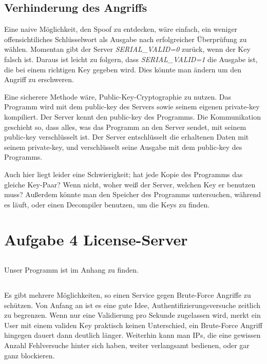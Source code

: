 \documentclass[10pt,a4paper]{article}
\begin{document}
\subsection{Verhinderung des Angriffs}
Eine naive Möglichkeit, den Spoof zu entdecken, wäre einfach, ein weniger offensichtiliches
Schlüsselwort als Ausgabe nach erfolgreicher Überprüfung zu wählen. Momentan gibt
der Server \textit{SERIAL\_VALID=0} zurück, wenn der Key falsch ist.
Daraus ist leicht zu folgern, dass \textit{SERIAL\_VALID=1} die Ausgabe ist, die
bei einem richtigen Key gegeben wird. Dies könnte man ändern um den Angriff
zu erschweren.

Eine sicherere Methode wäre, Public-Key-Cryptographie zu nutzen. Das Programm wird
mit dem public-key des Servers sowie seinem eigenen private-key kompiliert.
Der Server kennt den public-key des Programms. Die Kommunikation geschieht so,
dass alles, was das Programm an den Server sendet, mit seinem public-key verschlüsselt ist.
Der Server entschlüsselt die erhaltenen Daten mit seinem private-key, und
verschlüsselt seine Ausgabe mit dem public-key des Programms.

Auch hier liegt leider eine Schwierigkeit; hat jede Kopie des Programms das gleiche
Key-Paar? Wenn nicht, woher weiß der Server, welchen Key er benutzen muss?
Außerdem könnte man den Speicher des Programms untersuchen, während es läuft,
oder einen Decompiler benutzen, um die Keys zu finden.

\section{Aufgabe 4 License-Server}
\setcounter{subsection}{0}
\subsection{}
Unser Programm ist im Anhang zu finden.

\subsection{}
Es gibt mehrere Möglichkeiten, so einen Service gegen Brute-Force Angriffe zu schützen.
Von Anfang an ist es eine gute Idee, Authentifizierungsversuche zeitlich zu begrenzen.
Wenn nur eine Validierung pro Sekunde zugelassen wird, merkt ein User mit einem validen
Key praktisch keinen Unterschied, ein Brute-Force Angriff hingegen dauert dann deutlich länger.
Weiterhin kann man IPs, die eine gewissen Anzahl Fehlversuche hinter sich haben, weiter
verlangsamt bedienen, oder gar ganz blockieren.
\end{document}
